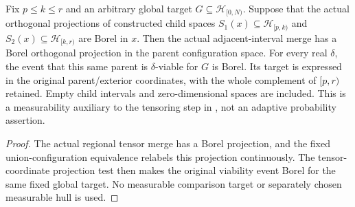\begin{lemma}
    \label{lem:borel_actual_adjacent_interval_merge}
    \leanok
    Fix $p\le k\le r$ and an arbitrary global target
    $G\subseteq\mathcal H_{[0,N)}$. Suppose that the actual orthogonal
    projections of constructed child spaces
    $S_1(x)\subseteq\mathcal H_{[p,k)}$ and
    $S_2(x)\subseteq\mathcal H_{[k,r)}$ are Borel in $x$. Then the actual
    adjacent-interval merge has a Borel orthogonal projection in the parent
    configuration space. For every real $\delta$, the event that this same
    parent is $\delta$-viable for $G$ is Borel. Its target is expressed in
    the original parent/exterior coordinates, with the whole complement of
    $[p,r)$ retained. Empty child intervals and zero-dimensional spaces are
    included. This is a measurability auxiliary to the tensoring step in
    \cite[lines 500--523]{Arad2016RigorousRG}, not an adaptive probability
    assertion.
\end{lemma}
\begin{proof}\leanok
    The actual regional tensor merge has a Borel projection, and the fixed
    union-configuration equivalence relabels this projection continuously.
    The tensor-coordinate projection test then makes the original viability
    event Borel for the same fixed global target. No measurable comparison
    target or separately chosen measurable hull is used.
\end{proof}




